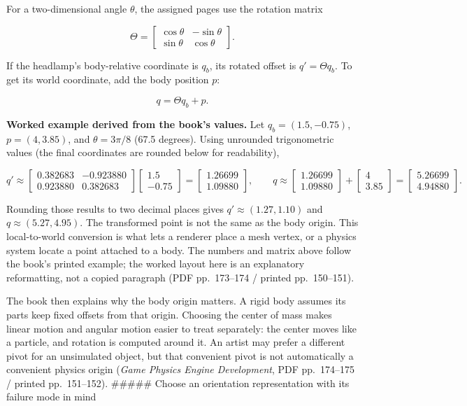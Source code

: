 For a two-dimensional angle \(\theta\), the assigned pages use the rotation matrix

\[
\Theta = \begin{bmatrix}
\cos\theta & -\sin\theta \\
\sin\theta & \cos\theta
\end{bmatrix}.
\]

If the headlamp's body-relative coordinate is \(q_b\), its rotated offset is \(q' = \Theta q_b\). To get its world coordinate, add the body position \(p\):

\[
q = \Theta q_b + p.
\]

\textbf{Worked example derived from the book's values.} Let \(q_b = (1.5,-0.75)\), \(p=(4,3.85)\), and \(\theta=3\pi/8\) (67.5 degrees). Using unrounded trigonometric values (the final coordinates are rounded below for readability),

\[
q' \approx \begin{bmatrix}0.382683&-0.923880\\0.923880&0.382683\end{bmatrix}
\begin{bmatrix}1.5\\-0.75\end{bmatrix}
= \begin{bmatrix}1.26699\\1.09880\end{bmatrix},
\qquad
q \approx \begin{bmatrix}1.26699\\1.09880\end{bmatrix}
+ \begin{bmatrix}4\\3.85\end{bmatrix}
= \begin{bmatrix}5.26699\\4.94880\end{bmatrix}.
\]

Rounding those results to two decimal places gives \(q'\approx(1.27,1.10)\) and \(q\approx(5.27,4.95)\). The transformed point is not the same as the body origin. This local-to-world conversion is what lets a renderer place a mesh vertex, or a physics system locate a point attached to a body. The numbers and matrix above follow the book's printed example; the worked layout here is an explanatory reformatting, not a copied paragraph (PDF pp.~173--174 / printed pp.~150--151).

The book then explains why the body origin matters. A rigid body assumes its parts keep fixed offsets from that origin. Choosing the center of mass makes linear motion and angular motion easier to treat separately: the center moves like a particle, and rotation is computed around it. An artist may prefer a different pivot for an unsimulated object, but that convenient pivot is not automatically a convenient physics origin (\emph{Game Physics Engine Development}, PDF pp.~174--175 / printed pp.~151--152). \#\#\#\#\# Choose an orientation representation with its failure mode in mind

